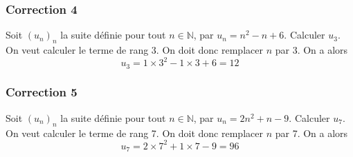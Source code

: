 \documentclass[15pt, mathserif]{beamer}
\newcommand{\N}{\mathbb{N}}			%
\begin{document}
\begin{frame}
\vspace{-10mm}
	\frametitle{Correction 4}
Soit $(u_n)_n$ la suite définie pour tout $n \in \N$, par $u_n=n^2-n+6$. Calculer $u_{3}$. 
 \vfil 
  On veut calculer le terme de rang 3. 
 \vfil 
 On doit donc remplacer $n$ par 3. On a alors $$u_{3}=1\times 3^2-1\times3+6=12$$\end{frame}


\begin{frame}
\vspace{-10mm}
	\frametitle{Correction 5}
Soit $(u_n)_n$ la suite définie pour tout $n \in \N$, par $u_n=2n^2+n-9$. Calculer $u_{7}$. 
 \vfil 
  On veut calculer le terme de rang 7. 
 \vfil 
 On doit donc remplacer $n$ par 7. On a alors $$u_{7}=2\times 7^2+1\times7-9=96$$\end{frame}
\end{document}
